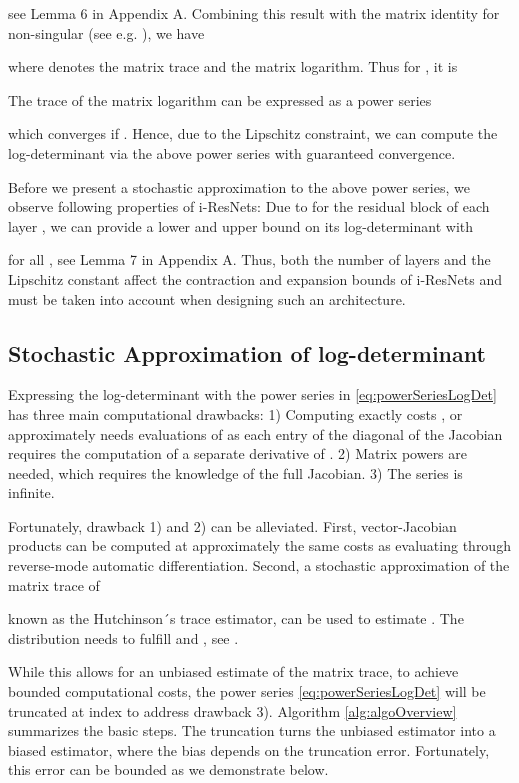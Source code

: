 \documentclass{article}
\begin{document}
see Lemma 6 in Appendix A. Combining this result with the matrix identity  for non-singular  (see e.g. \citet{Withers}), we have

where  denotes the matrix trace and  the matrix logarithm. Thus for , it is

The trace of the matrix logarithm can be expressed as a power series \citep{Hall}

which converges if . Hence, due to the Lipschitz constraint, we can compute the log-determinant via the above power series with guaranteed convergence. 

Before we present a stochastic approximation to the above power series, we observe following properties of i-ResNets: Due to  for the residual block of each layer , we can provide a lower and upper bound on its log-determinant with

for all , see Lemma 7 in Appendix A. Thus, both the number of layers  and the Lipschitz constant affect the contraction and expansion bounds of i-ResNets and must be taken into account when designing such an architecture.


\subsection{Stochastic Approximation of log-determinant}
\label{sec:approxLogDet}
Expressing the log-determinant with the power series in \eqref{eq:powerSeriesLogDet} has three main computational drawbacks: 1) Computing  exactly costs , or approximately needs  evaluations of  as each entry of the diagonal of the Jacobian requires the computation of a separate derivative of  \citep{ffjord}. 2) Matrix powers  are needed, which requires the knowledge of the full Jacobian. 3) The series is infinite. 

Fortunately, drawback 1) and 2) can be alleviated. First, vector-Jacobian products  can be computed at approximately the same costs as evaluating  through reverse-mode automatic differentiation. Second, a stochastic approximation of the matrix trace of 

known as the Hutchinson´s trace estimator, can be used to estimate . The distribution  needs to fulfill  and , see \citep{Hutchinson, AvronToledo}.

While this allows for an unbiased estimate of the matrix trace, to achieve bounded computational costs, the power series \eqref{eq:powerSeriesLogDet} will be truncated at index  to address drawback 3). Algorithm \ref{alg:algoOverview} summarizes the basic steps. The truncation turns the unbiased estimator into a biased estimator, where the bias depends on the truncation error. Fortunately, this error can be bounded as we demonstrate below.
\end{document}
